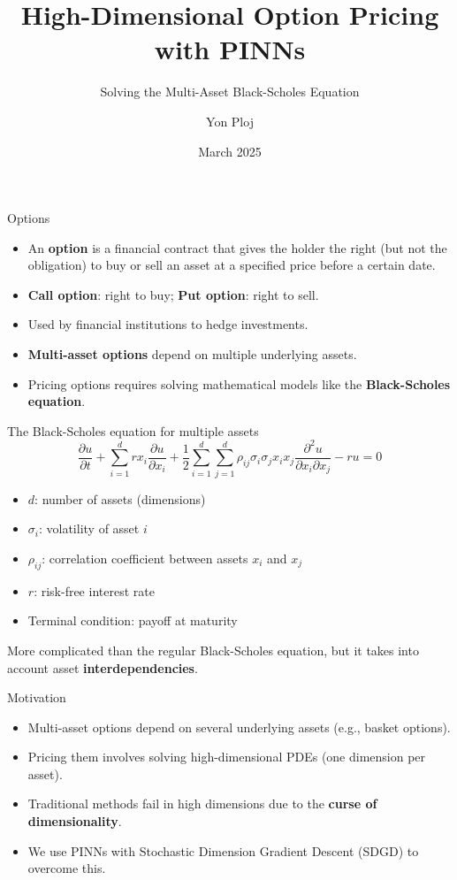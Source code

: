 \documentclass{beamer}
\title{High-Dimensional Option Pricing with PINNs}
\subtitle{Solving the Multi-Asset Black-Scholes Equation}
\author{Yon Ploj}
\institute{DiffProg project}
\date{March 2025}
\begin{document}
\frame{\titlepage}

\begin{frame}{Options}
\begin{itemize}
    \item An \textbf{option} is a financial contract that gives the holder the right (but not the obligation) to buy or sell an asset at a specified price before a certain date.
    \item \textbf{Call option}: right to buy; \textbf{Put option}: right to sell.
    \item Used by financial institutions to hedge investments.
    \item \textbf{Multi-asset options} depend on multiple underlying assets.
    \item Pricing options requires solving mathematical models like the \textbf{Black-Scholes equation}.
\end{itemize}
\end{frame}

\begin{frame}{The Black-Scholes equation for multiple assets}
\small
\[
\frac{\partial u}{\partial t}
+ \sum_{i=1}^{d} r x_i \frac{\partial u}{\partial x_i}
+ \frac{1}{2} \sum_{i=1}^{d} \sum_{j=1}^{d} \rho_{ij} \sigma_i \sigma_j x_i x_j \frac{\partial^2 u}{\partial x_i \partial x_j}
- r u = 0
\]

\begin{itemize}
    \item $d$: number of assets (dimensions)
    \item $\sigma_i$: volatility of asset $i$
    \item $\rho_{ij}$: correlation coefficient between assets $x_i$ and $x_j$
    \item $r$: risk-free interest rate
    \item Terminal condition: payoff at maturity
\end{itemize}
More complicated than the regular Black-Scholes equation, but it takes into account asset \textbf{interdependencies}.
\end{frame}

\begin{frame}{Motivation}
\begin{itemize}
    \item Multi-asset options depend on several underlying assets (e.g., basket options).
    \item Pricing them involves solving high-dimensional PDEs (one dimension per asset).
    \item Traditional methods fail in high dimensions due to the \textbf{curse of dimensionality}.
    \item We use PINNs with Stochastic Dimension Gradient Descent (SDGD) to overcome this.
\end{itemize}
\end{frame}
\end{document}
